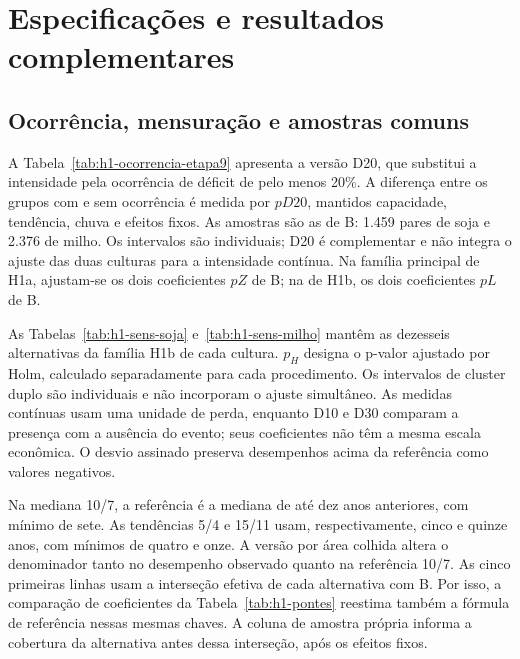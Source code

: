 \clearpage
\appendix
\setcounter{section}{0}
\renewcommand{\thesection}{\Alph{section}}
\renewcommand{\thesubsection}{\Alph{section}.\arabic{subsection}}
\setcounter{table}{0}
\renewcommand{\thetable}{A\arabic{table}}
\setcounter{equation}{0}
\renewcommand{\theequation}{A\arabic{equation}}
\section{Especificações e resultados complementares}
\label{ap:complementos}

\subsection{Ocorrência, mensuração e amostras comuns}

A Tabela~\ref{tab:h1-ocorrencia-etapa9} apresenta a versão D20, que substitui a intensidade pela ocorrência de déficit de pelo menos 20\%. A diferença entre os grupos com e sem ocorrência é medida por $pD20$, mantidos capacidade, tendência, chuva e efeitos fixos. As amostras são as de B: 1.459 pares de soja e 2.376 de milho. Os intervalos são individuais; D20 é complementar e não integra o ajuste das duas culturas para a intensidade contínua. Na família principal de H1a, ajustam-se os dois coeficientes $pZ$ de B; na de H1b, os dois coeficientes $pL$ de B.


\FloatBarrier

As Tabelas~\ref{tab:h1-sens-soja} e~\ref{tab:h1-sens-milho} mantêm as dezesseis alternativas da família H1b de cada cultura. $p_H$ designa o p-valor ajustado por Holm, calculado separadamente para cada procedimento. Os intervalos de cluster duplo são individuais e não incorporam o ajuste simultâneo. As medidas contínuas usam uma unidade de perda, enquanto D10 e D30 comparam a presença com a ausência do evento; seus coeficientes não têm a mesma escala econômica. O desvio assinado preserva desempenhos acima da referência como valores negativos.

Na mediana 10/7, a referência é a mediana de até dez anos anteriores, com mínimo de sete. As tendências 5/4 e 15/11 usam, respectivamente, cinco e quinze anos, com mínimos de quatro e onze. A versão por área colhida altera o denominador tanto no desempenho observado quanto na referência 10/7. As cinco primeiras linhas usam a interseção efetiva de cada alternativa com B. Por isso, a comparação de coeficientes da Tabela~\ref{tab:h1-pontes} reestima também a fórmula de referência nessas mesmas chaves. A coluna de amostra própria informa a cobertura da alternativa antes dessa interseção, após os efeitos fixos.

